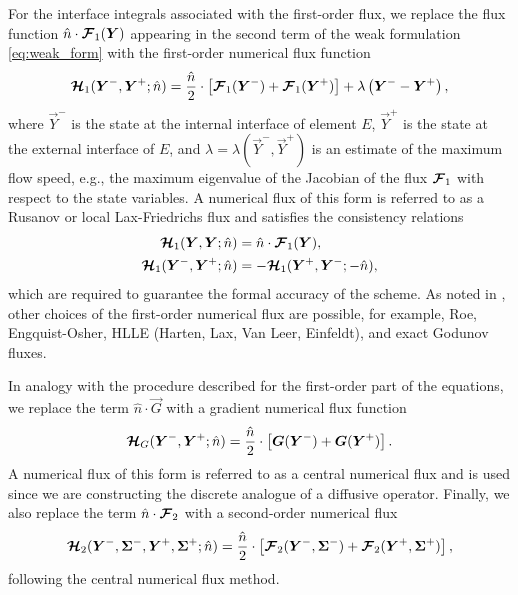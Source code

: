 \documentclass{report}
\numberwithin{equation}{section}
\begin{document}
For the interface integrals associated with the first-order flux, we replace the flux function $\hat n \cdot \boldsymbol{{\mathcal{F}}}_1 (\boldsymbol{{Y}})$ appearing in the second term of the weak formulation \eqref{eq:weak_form} with the first-order numerical flux function 
\begin{equation}
    \boldsymbol{{\mathcal{H}}}_1 (\boldsymbol{{Y}}^-, \boldsymbol{{Y}}^+; \hat n) =
    \frac{\hat n}{2} \cdot \left[\boldsymbol{{\mathcal{F}}}_1 (\boldsymbol{{Y}}^-) + \boldsymbol{{\mathcal{F}}}_1(\boldsymbol{{Y}}^+) \right] + \lambda \left(\boldsymbol{{Y}}^- - \boldsymbol{{Y}}^+\right) ,
\end{equation}
where $\vec Y^-$ is the state at the internal interface of element $E$, $\vec Y^+$ is the state at the external interface of $E$, and $\lambda = \lambda(\vec Y^-, \vec Y^+)$ is an estimate of the maximum flow speed, e.g., the maximum eigenvalue of the Jacobian of the flux $\boldsymbol{{\mathcal{F}}}_1$ with respect to the state variables. A numerical flux of this form is referred to as a Rusanov or local Lax-Friedrichs flux and satisfies the consistency relations
\begin{align}
    \boldsymbol{{\mathcal{H}}}_1 (\boldsymbol{{Y}}, \boldsymbol{{Y}}; \hat n) & = \hat n \cdot \boldsymbol{{\mathcal{F}}}_1 (\boldsymbol{{Y}}), \\
    \boldsymbol{{\mathcal{H}}}_1 (\boldsymbol{{Y}}^-, \boldsymbol{{Y}}^+; \hat n) & = - \boldsymbol{{\mathcal{H}}}_1 (\boldsymbol{{Y}}^+, \boldsymbol{{Y}}^-; -\hat n),
\end{align}
which are required to guarantee the formal accuracy of the scheme. As noted in \citet{bassi:1997nse}, other choices of the first-order numerical flux are possible, for example, Roe, Engquist-Osher, HLLE (Harten, Lax, Van Leer, Einfeldt), and exact Godunov fluxes.

In analogy with the procedure described for the first-order part of the equations, we replace the term $\hat n \cdot \vec G$ with a gradient numerical flux function 
\begin{equation}
    \boldsymbol{{\mathcal{H}}}_G (\boldsymbol{{Y}}^-, \boldsymbol{{Y}}^+; \hat n) 
    = \frac{\hat n}{2} \cdot \left[ \boldsymbol{{G}}(\boldsymbol{{Y}}^-) + \boldsymbol{{G}}(\boldsymbol{{Y}}^+) \right].
\end{equation}
A numerical flux of this form is referred to as a central numerical flux and is used since we are constructing the discrete analogue of a diffusive operator. Finally, we also replace the term $\hat n \cdot \boldsymbol{{\mathcal{F}}}_2$ with a second-order numerical flux
\begin{equation}
    \boldsymbol{{\mathcal{H}}}_2 (\boldsymbol{{Y}}^-, \boldsymbol{{\Sigma}}^-, \boldsymbol{{Y}}^+, \boldsymbol{{\Sigma}}^+; \hat n) 
    = \frac{\hat n}{2} \cdot \left[ \boldsymbol{{\mathcal{F}}}_2 (\boldsymbol{{Y}}^-, \boldsymbol{{\Sigma}}^-) + \boldsymbol{{\mathcal{F}}}_2 (\boldsymbol{{Y}}^+, \boldsymbol{{\Sigma}}^+) \right],
\end{equation}
following the central numerical flux method. 
\end{document}
